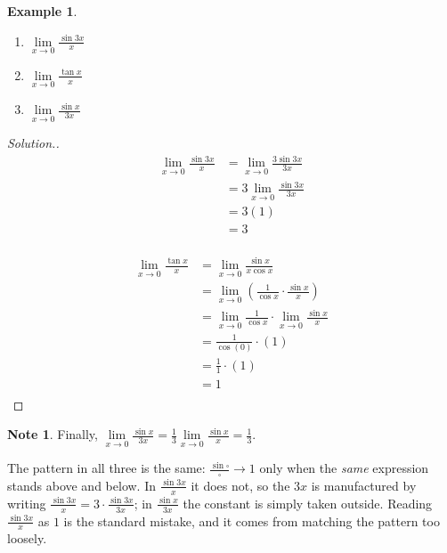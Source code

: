 \documentclass[11pt,a4paper]{article}
\theoremstyle{definition}
\newtheorem{example}[thm]{Example}
\newtheorem{note}[thm]{Note}
\newenvironment{solution}
  {\renewcommand{\qedsymbol}{}\begin{proof}[\textit{Solution}.]}
  {\end{proof}}
\begin{document}
\begin{example}

\begin{enumerate}
\item $\lim\limits_{x\longrightarrow 0} \frac{\sin 3x}{x}$
\item $\lim\limits_{x\longrightarrow 0} \frac{\tan x}{x}$
\item $\lim\limits_{x\longrightarrow 0} \frac{\sin x}{3x}$\\
\end{enumerate}
\end{example}
\begin{solution}

\begin{align*}
\lim_{x\longrightarrow 0} \frac{\sin 3x}{x} & = \lim_{x\longrightarrow 0} \frac{3\sin 3x}{3x}\\
                                            & = 3 \lim_{x\longrightarrow 0} \frac{\sin 3x}{3x}\\
                                            & = 3(1)\\
                                            & = 3\\
\end{align*}



\begin{align*}
\lim_{x\longrightarrow 0}\frac{\tan x}{x} & = \lim_{x\longrightarrow 0} \frac{\sin x}{x\cos x}\\
                                          & = \lim_{x\longrightarrow 0} \left(\frac{1}{\cos x}\cdot \frac{\sin x}{x}\right)\\
                                          & = \lim_{x\longrightarrow 0}\frac{1}{\cos x}\cdot \lim_{x\longrightarrow 0}\frac{\sin x}{x}\\
                                          & = \frac{1}{\cos (0)}\cdot (1)\\
                                          & = \frac{1}{1}\cdot (1)\\
                                          & = 1\\
\end{align*}
\end{solution}

\begin{note}
Finally, $\lim\limits_{x\to 0}\frac{\sin x}{3x}
=\frac{1}{3}\lim\limits_{x\to 0}\frac{\sin x}{x}=\frac{1}{3}$.

The pattern in all three is the same: $\frac{\sin\square}{\square}\to 1$ only when
the \emph{same} expression stands above and below. In $\frac{\sin 3x}{x}$ it does
not, so the $3x$ is manufactured by writing
$\frac{\sin 3x}{x}=3\cdot\frac{\sin 3x}{3x}$; in $\frac{\sin x}{3x}$ the constant
is simply taken outside. Reading $\frac{\sin 3x}{x}$ as $1$ is the standard
mistake, and it comes from matching the pattern too loosely.
\end{note}
\pagebreak
\end{document}
